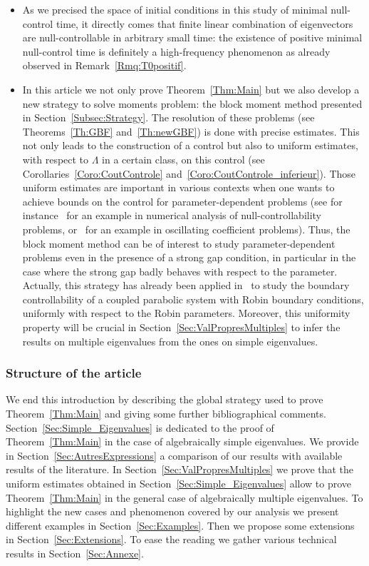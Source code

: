 \begin{itemize}
\item As we precised the space of initial conditions in this study of minimal null-control time, it directly comes that finite linear combination of eigenvectors are null-controllable in arbitrary small time: the existence of positive minimal null-control time is definitely a high-frequency phenomenon as already observed in Remark~\ref{Rmq:T0positif}.

\item In this article we not only prove Theorem~\ref{Thm:Main} but we also develop a new strategy to solve moments problem: the block moment method presented in Section~\ref{Subsec:Strategy}. The resolution of these problems (see Theorems~\ref{Th:GBF} and~\ref{Th:newGBF}) is done with precise estimates. This not only leads to the construction of a control but also to uniform estimates, with respect to $\Lambda$ in a certain class, on this control (see Corollaries~\ref{Coro:CoutControle} and~\ref{Coro:CoutControle_inferieur}). Those uniform estimates are important in various contexts when one wants to achieve bounds on the control for parameter-dependent problems (see for instance~\cite{AB18,ABM_2018} for an example in numerical analysis of null-controllability problems, or~\cite{LopezZuazua:2002} for an example in oscillating coefficient problems). Thus, the block moment method can be of interest to study parameter-dependent problems even in the presence of a strong gap condition, in particular in the case where the strong gap badly behaves with respect to the parameter. Actually, this strategy has already been applied in~\cite{BoyerBhandari:2019} to study the boundary controllability of a coupled parabolic system with Robin boundary conditions, uniformly with respect to the Robin parameters. Moreover, this uniformity property will be crucial in Section~\ref{Sec:ValPropresMultiples} to infer the results on multiple eigenvalues from the ones on simple eigenvalues.
\end{itemize}



\subsubsection{Structure of the article}

We end this introduction by describing the global strategy used to prove Theorem~\ref{Thm:Main} and giving some further bibliographical comments. Section~\ref{Sec:Simple_Eigenvalues} is dedicated to the proof of Theorem~\ref{Thm:Main} in the case of algebraically simple eigenvalues. We provide in Section~\ref{Sec:AutresExpressions} a comparison of our results with available results of the literature. In Section~\ref{Sec:ValPropresMultiples} we prove that the uniform estimates obtained in Section~\ref{Sec:Simple_Eigenvalues} allow to prove Theorem~\ref{Thm:Main} in the general case of algebraically multiple eigenvalues. To highlight the new cases and phenomenon covered by our analysis we present different examples in Section~\ref{Sec:Examples}. Then we propose some extensions in Section~\ref{Sec:Extensions}. To ease the reading we gather various technical results in Section~\ref{Sec:Annexe}.


